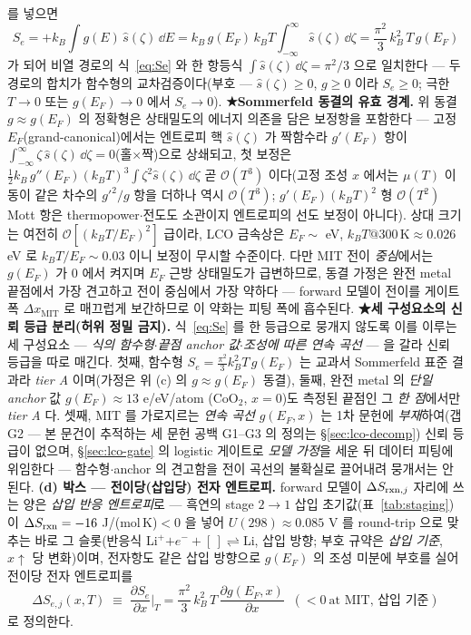 를 넣으면
\begin{equation}
S_e=+k_B\int g(E)\,\hat s(\zeta)\,\dd E
=k_B\,g(E_F)\,k_BT\!\int_{-\infty}^{\infty}\!\hat s(\zeta)\,\dd\zeta
=\frac{\pi^2}{3}\,k_B^2\,T\,g(E_F)
\label{eq:Sedirect}
\end{equation}
가 되어 비열 경로의 식~\eqref{eq:Se} 와 한 항등식 $\int \hat s(\zeta)\,\dd\zeta=\pi^2/3$ 으로 일치한다 --- 두 경로의
합치가 함수형의 교차검증이다(부호 --- $\hat s(\zeta)\ge0$, $g\ge0$ 이라 $S_e\ge0$; 극한 $T\to0$ 또는 $g(E_F)\to0$ 에서
$S_e\to0$).
\textbf{★Sommerfeld 동결의 유효 경계.} 위 동결 $g\approx g(E_F)$ 의 정확형은 상태밀도의 에너지 의존을 담은 보정항을
포함한다 --- 고정 $E_F$(grand-canonical)에서는 엔트로피 핵 $\hat s(\zeta)$ 가 짝함수라 $g'(E_F)$ 항이 $\int_{-\infty}^{\infty}\!\zeta\,\hat s(\zeta)\,\dd\zeta=0$(홀$\times$짝)으로
상쇄되고, 첫 보정은 $\tfrac12 k_B\,g''(E_F)(k_BT)^3\!\int\zeta^2 \hat s(\zeta)\,\dd\zeta$ 곧 $\mathcal O(T^3)$ 이다(고정 조성 $x$ 에서는
$\mu(T)$ 이동이 같은 차수의 $g'^2/g$ 항을 더하나 역시 $\mathcal O(T^3)$; $g'(E_F)(k_BT)^2$ 형 $\mathcal O(T^2)$ Mott 항은
thermopower$\cdot$전도도 소관이지 엔트로피의 선도 보정이 아니다). 상대 크기는 여전히 $\mathcal O[(k_BT/E_F)^2]$ 급이라,
LCO 금속상은 $E_F\sim$ eV, $k_BT@300\,\mathrm K\approx0.026$ eV 로 $k_BT/E_F\sim0.03$ 이니 보정이 무시할 수준이다. 다만 MIT 전이 \emph{중심}에서는 $g(E_F)$
가 0 에서 켜지며 $E_F$ 근방 상태밀도가 급변하므로, 동결 가정은 완전 metal 끝점에서 가장 견고하고 전이 중심에서
가장 약하다 --- forward 모델이 전이를 게이트 폭 $\Delta x_\mathrm{MIT}$ 로 매끄럽게 보간하므로 이 약화는 피팅 폭에
흡수된다. \textbf{★세 구성요소의 신뢰 등급 분리(허위 정밀 금지).}
식~\eqref{eq:Se} 를 한 등급으로 뭉개지 않도록 이를 이루는 세 구성요소 --- \emph{식의 함수형}$\cdot$\emph{끝점
anchor 값}$\cdot$\emph{조성에 따른 연속 곡선} --- 을 갈라 신뢰 등급을 따로 매긴다. 첫째, 함수형
$S_e=\tfrac{\pi^2}{3}k_B^2T\,g(E_F)$ 는 교과서 Sommerfeld 표준 결과라 \emph{tier A} 이며(가정은 위 (c) 의
$g\!\approx\!g(E_F)$ 동결), 둘째, 완전 metal 의 \emph{단일 anchor} 값 $g(E_F)\!\approx\!13$ e/eV/atom
($\mathrm{CoO_2}$, $x{=}0$)도 측정된 끝점인 그 \emph{한 점}에서만 \emph{tier A} 다\cite{motohashi2009}. 셋째,
MIT 를 가로지르는 \emph{연속 곡선} $g(E_F,x)$ 는 1차 문헌에 \emph{부재}하여(갭 G2 --- 본 문건이 추적하는
세 문헌 공백 G1--G3 의 정의는 \S\ref{sec:lco-decomp}) 신뢰 등급이 없으며,
\S\ref{sec:lco-gate} 의 logistic 게이트로 \emph{모델 가정}을 세운 뒤 데이터 피팅에 위임한다 --- 함수형$\cdot$anchor
의 견고함을 전이 곡선의 불확실로 끌어내려 뭉개서는 안 된다. \textbf{(d) 박스 --- 전이당(삽입당) 전자 엔트로피.} forward 모델이 $\Delta S_{\mathrm{rxn},j}$ 자리에 쓰는 양은 \emph{삽입 반응 엔트로피}로 --- 흑연의
stage $2\!\to\!1$ 삽입 초기값(표~\ref{tab:staging})이 $\Delta S_{\mathrm{rxn}}=-16$ J/(mol\,K)$<0$
을 넣어 $U(298)\approx0.085$ V 를 round-trip 으로 맞추는 바로 그 슬롯(반응식
Li$^+$$+e^-+[\,]\rightleftharpoons$Li, 삽입 방향; 부호 규약은 \emph{삽입 기준}, $x\!\uparrow$ 당 변화)이며,
전자항도 같은 삽입 방향으로 $g(E_F)$ 의 조성 미분에 부호를 실어 전이당 전자 엔트로피를
\begin{equation}
\boxed{\;\Delta S_{e,j}(x,T)\;\equiv\;\frac{\partial S_e}{\partial x}\Big|_T
=\frac{\pi^2}{3}\,k_B^2\,T\,\frac{\partial g(E_F,x)}{\partial x}\;\;(<0\ \text{at MIT, 삽입 기준})\;}
\label{eq:dSe}
\end{equation}
로 정의한다.

